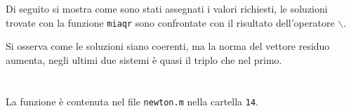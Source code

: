 \documentclass[10pt,a4paper]{article}
\begin{document}
\section{}
Di seguito si mostra come sono stati assegnati i valori richiesti, le soluzioni trovate con la funzione \texttt{miaqr} sono confrontate con il risultato dell'operatore \texttt{$\backslash$}.

Si osserva come le soluzioni siano coerenti, ma la norma del vettore residuo aumenta, negli ultimi due sistemi è quasi il triplo che nel primo.\\
\pagebreak
\section{}
La funzione è contenuta nel file \texttt{newton.m} nella cartella \texttt{14}.

\pagebreak
\end{document}
